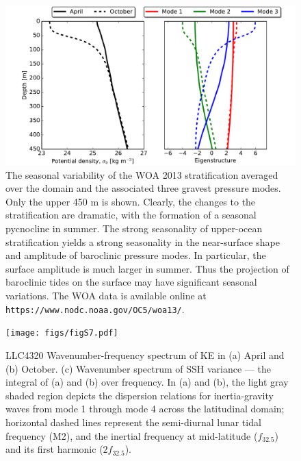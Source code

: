 \documentclass[draft,grl]{agutexSI}
\begin{document}
 \begin{figure}
    \begin{center}
      \includegraphics[width=40pc]{figs/figS6.pdf}
   \caption{The seasonal variability of the WOA 2013 \citep{levitus_etal2013} stratification averaged  over
   the domain and the associated three gravest pressure modes. Only the upper 450 m is shown.
   Clearly, the changes to the stratification
   are dramatic, with the formation of a seasonal pycnocline in summer. The strong
   seasonality of upper-ocean stratification yields a strong seasonality in the
   near-surface shape and amplitude of baroclinic pressure modes.
   In particular, the surface amplitude is much larger in summer. Thus the projection
   of baroclinic tides on the surface may have significant seasonal variations. The WOA data is
   available online at \texttt{https://www.nodc.noaa.gov/OC5/woa13/}.}
   \label{figS3}
   \end{center}
 \end{figure}


 \begin{figure}
    \begin{center}
      \texttt{[image: figs/figS7.pdf]}
   \caption{LLC4320 Wavenumber-frequency spectrum of KE in (a) April
    and (b) October. (c) Wavenumber spectrum of SSH variance — the integral of (a)
    and (b) over frequency. In (a) and (b), the light gray shaded region depicts the
    dispersion relations for inertia-gravity waves from mode 1 through mode 4 across
    the latitudinal domain; horizontal dashed lines represent the semi-diurnal lunar
    tidal frequency (M2), and the inertial frequency at mid-latitude ($f_{32.5}$) and its
    first harmonic ($2f_{32.5}$).}
   \label{figS7}
   \end{center}
 \end{figure}
\end{document}
